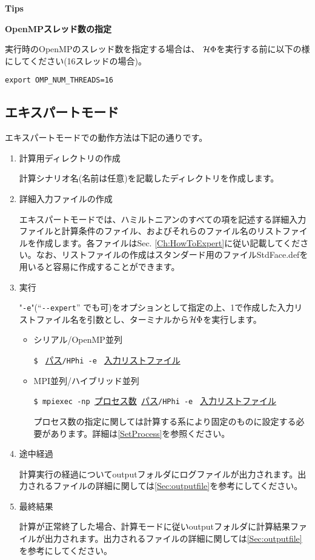 \begin{screen}
\Large 
{\bf Tips}
\normalsize

{\bf OpenMPスレッド数の指定}

実行時のOpenMPのスレッド数を指定する場合は、
$\mathcal{H} \Phi$を実行する前に以下の様にしてください(16スレッドの場合)。
\begin{verbatim}
export OMP_NUM_THREADS=16
\end{verbatim}

\end{screen}

\newpage
\subsection{エキスパートモード}
エキスパートモードでの動作方法は下記の通りです。

 \begin{enumerate}
   \item  計算用ディレクトリの作成

計算シナリオ名(名前は任意)を記載したディレクトリを作成します。

   \item  詳細入力ファイルの作成

エキスパートモードでは、ハミルトニアンのすべての項を記述する詳細入力ファイルと計算条件のファイル、およびそれらのファイル名のリストファイルを作成します。各ファイルはSec. \ref{Ch:HowToExpert}に従い記載してください。なお、リストファイルの作成はスタンダード用のファイルStdFace.defを用いると容易に作成することができます。

 \item  実行

"\verb|-e|"(``\verb|--expert|'' でも可)をオプションとして指定の上、1で作成した入力リストファイル名を引数とし、ターミナルから$\mathcal{H} \Phi$を実行します。

\begin{itemize}

\item シリアル/OpenMP並列

\verb|$ | \underline{パス}\verb|/HPhi -e | \underline{入力リストファイル} 

\item MPI並列/ハイブリッド並列

\verb|$ mpiexec -np |\underline{プロセス数}\verb| |\underline{パス}\verb|/HPhi -e | \underline{入力リストファイル}

{プロセス数の指定に関しては計算する系により固定のものに設定する必要があります。詳細は\ref{SetProcess}を参照ください。}

\end{itemize}

\item 途中経過

計算実行の経過についてoutputフォルダにログファイルが出力されます。出力されるファイルの詳細に関しては\ref{Sec:outputfile}を参考にしてください。

\item 最終結果

計算が正常終了した場合、計算モードに従いoutputフォルダに計算結果ファイルが出力されます。出力されるファイルの詳細に関しては\ref{Sec:outputfile}を参考にしてください。
\end{enumerate}

